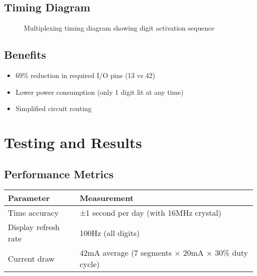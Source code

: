 \documentclass{article}
\begin{document}
\subsection{Timing Diagram}
\begin{figure}[h]
\centering
{}
\caption{Multiplexing timing diagram showing digit activation sequence}
\label{fig:timing}
\end{figure}

\subsection{Benefits}
\begin{itemize}
\item 69\% reduction in required I/O pins (13 vs 42)
\item Lower power consumption (only 1 digit lit at any time)
\item Simplified circuit routing
\end{itemize}

\section{Testing and Results}

\subsection{Performance Metrics}
\begin{tabularx}{\linewidth}{|l|X|}
\hline
\textbf{Parameter} & \textbf{Measurement} \\ \hline
Time accuracy & ±1 second per day (with 16MHz crystal) \\ \hline
Display refresh rate & 100Hz (all digits) \\ \hline
Current draw & 42mA average (7 segments × 20mA × 30\% duty cycle) \\ \hline
\end{tabularx}
\end{document}
